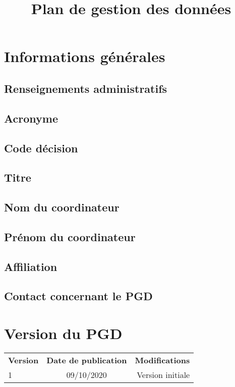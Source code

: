\documentclass{article}
\title{Plan de gestion des données}
\author{}
\date{}
\begin{document}
\begin{titlepage}
\maketitle
\bigskip
\section*{Informations générales}
\subsection* {Renseignements administratifs}
\subsection*{Acronyme}
\subsection*{Code décision}
\subsection*{Titre}
\subsection*{Nom du coordinateur}
\subsection*{Prénom du coordinateur}
\subsection*{Affiliation}
\subsection*{Contact concernant le PGD}

\bigskip
\bigskip
\section*{Version du PGD}
\begin{tabular}{ l | c | r }
   \textbf{Version} & \textbf{Date de publication} & \textbf{Modifications} \\
   1 & 09/10/2020 & Version initiale \\
\end{tabular}
\end{titlepage}
\end{document}
